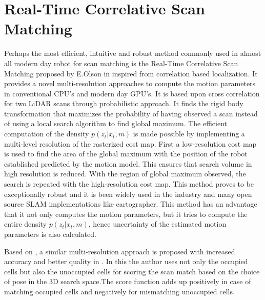 \section{Real-Time Correlative Scan Matching}
Perhaps the most efficient, intuitive and robust method commonly used in almost all modern day robot for scan matching is the Real-Time Correlative Scan Matching proposed by E.Olson in \cite{E.B.Olson} inspired from \cite{Konolige} correlation based localization. It provides a novel multi-resolution approaches to compute the motion parameters in conventional CPU's and modern day GPU's. It is based upon cross correlation for two LiDAR scans through probabilistic approach. It finds the rigid body transformation that maximizes the probability of having observed a scan instead of using a local search algorithm to find global maximum. The efficient computation of the density $p(z_t | x_t, m)$ is made possible by implementing a multi-level resolution of the rasterized cost map. First a low-resolution cost map is used to find the area of the global maximum with the position of the robot established predicted by the motion model. This ensures that search volume in high resolution is reduced. With the region of global maximum observed, the search is repeated with the high-resolution cost map. This method proves to be exceptionally robust and it is been widely used in the industry and many open source SLAM implementations like cartographer. This method has an advantage that it not only computes the motion parameters, but it tries to compute the entire density $p(z_t | x_t, m)$, hence uncertainty of the estimated motion parameters is also calculated.
\par
Based on \cite{E.Olson}, a similar multi-resolution approach is proposed with increased accuracy and better quality in \cite{P.Vath}. In this the author uses not only the occupied cells but also the unoccupied cells for scoring the scan match based on the choice of pose in the 3D search space.The score function adds up positively in case of matching occupied cells and negatively for mismatching unoccupied cells.

